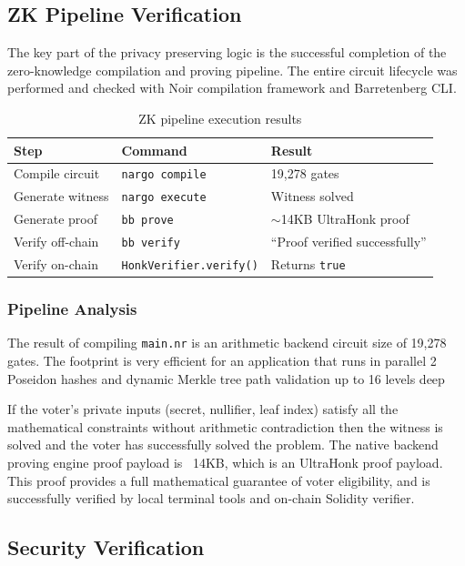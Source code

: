 \documentclass[12pt, a4paper]{report}
\begin{document}
\subsection{ZK Pipeline Verification}

The key part of the privacy preserving logic is the successful completion of the zero-knowledge compilation and proving pipeline. The entire circuit lifecycle was performed and checked with Noir compilation framework and Barretenberg CLI.

\begin{table}[H]
\centering
\caption{ZK pipeline execution results}
\label{tab:zk_results}
\begin{tabular}{|l|l|l|}
\hline
\textbf{Step} & \textbf{Command} & \textbf{Result} \\ \hline
Compile circuit & \texttt{nargo compile} & 19,278 gates \\ \hline
Generate witness & \texttt{nargo execute} & Witness solved \\ \hline
Generate proof & \texttt{bb prove} & $\sim$14KB UltraHonk proof \\ \hline
Verify off-chain & \texttt{bb verify} & ``Proof verified successfully'' \\ \hline
Verify on-chain & \texttt{HonkVerifier.verify()} & Returns \texttt{true} \\ \hline
\end{tabular}
\end{table}

\subsubsection*{Pipeline Analysis}
The result of compiling \texttt{main.nr} is an arithmetic backend circuit size of 19,278 gates. The footprint is very efficient for an application that runs in parallel 2 Poseidon hashes and dynamic Merkle tree path validation up to 16 levels deep

If the voter's private inputs (secret, nullifier, leaf index) satisfy all the mathematical constraints without arithmetic contradiction then the witness is solved and the voter has successfully solved the problem. The native backend proving engine proof payload is ~14KB, which is an UltraHonk proof payload. This proof provides a full mathematical guarantee of voter eligibility, and is successfully verified by local terminal tools and on-chain Solidity verifier.

\subsection{Security Verification}
\end{document}

